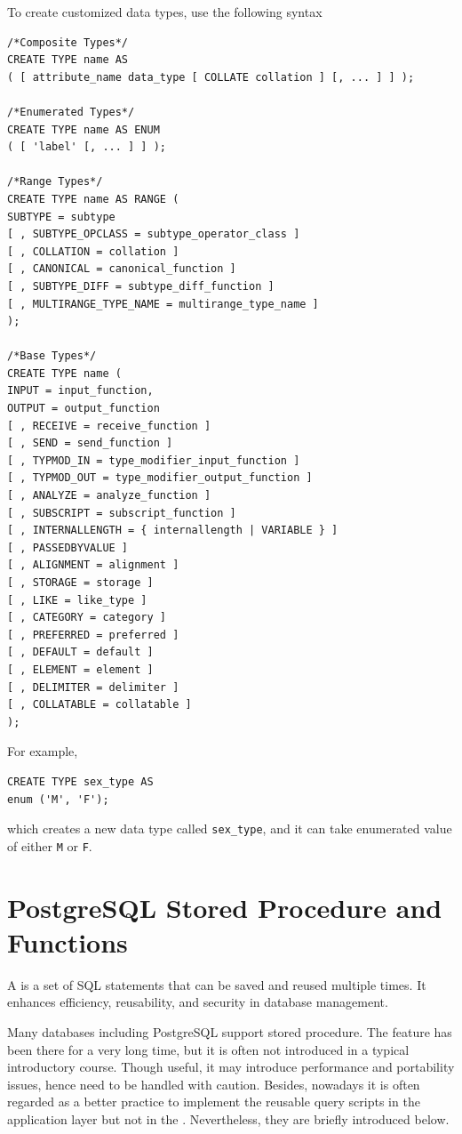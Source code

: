 To create customized data types, use the following syntax
\begin{lstlisting}
/*Composite Types*/
CREATE TYPE name AS
( [ attribute_name data_type [ COLLATE collation ] [, ... ] ] );

/*Enumerated Types*/
CREATE TYPE name AS ENUM
( [ 'label' [, ... ] ] );

/*Range Types*/
CREATE TYPE name AS RANGE (
SUBTYPE = subtype
[ , SUBTYPE_OPCLASS = subtype_operator_class ]
[ , COLLATION = collation ]
[ , CANONICAL = canonical_function ]
[ , SUBTYPE_DIFF = subtype_diff_function ]
[ , MULTIRANGE_TYPE_NAME = multirange_type_name ]
);

/*Base Types*/
CREATE TYPE name (
INPUT = input_function,
OUTPUT = output_function
[ , RECEIVE = receive_function ]
[ , SEND = send_function ]
[ , TYPMOD_IN = type_modifier_input_function ]
[ , TYPMOD_OUT = type_modifier_output_function ]
[ , ANALYZE = analyze_function ]
[ , SUBSCRIPT = subscript_function ]
[ , INTERNALLENGTH = { internallength | VARIABLE } ]
[ , PASSEDBYVALUE ]
[ , ALIGNMENT = alignment ]
[ , STORAGE = storage ]
[ , LIKE = like_type ]
[ , CATEGORY = category ]
[ , PREFERRED = preferred ]
[ , DEFAULT = default ]
[ , ELEMENT = element ]
[ , DELIMITER = delimiter ]
[ , COLLATABLE = collatable ]
);
\end{lstlisting}
For example,
\begin{lstlisting}
CREATE TYPE sex_type AS
enum ('M', 'F');
\end{lstlisting}
which creates a new data type called \verb|sex_type|, and it can take enumerated value of either \verb|M| or \verb|F|.

\section{PostgreSQL Stored Procedure and Functions}

A  is a set of SQL statements that can be saved and reused multiple times. It enhances efficiency, reusability, and security in database management. 

Many databases including PostgreSQL support stored procedure. The feature has been there for a very long time, but it is often not introduced in a typical introductory course. Though useful, it may introduce performance and portability issues, hence need to be handled with caution. Besides, nowadays it is often regarded as a better practice to implement the reusable query scripts in the application layer but not in the . Nevertheless, they are briefly introduced below.

